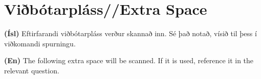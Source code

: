 \documentclass[addpoints]{exam}
\begin{document}
\section{Viðbótarpláss//Extra Space}

\textbf{(Ísl)} Eftirfarandi viðbótarpláss verður skannað inn. Sé það notað, vísið til þess í viðkomandi spurningu.

\textbf{(En)} The following extra space will be scanned. If it is used, reference it in the relevant question.


\newpage

\end{document}
